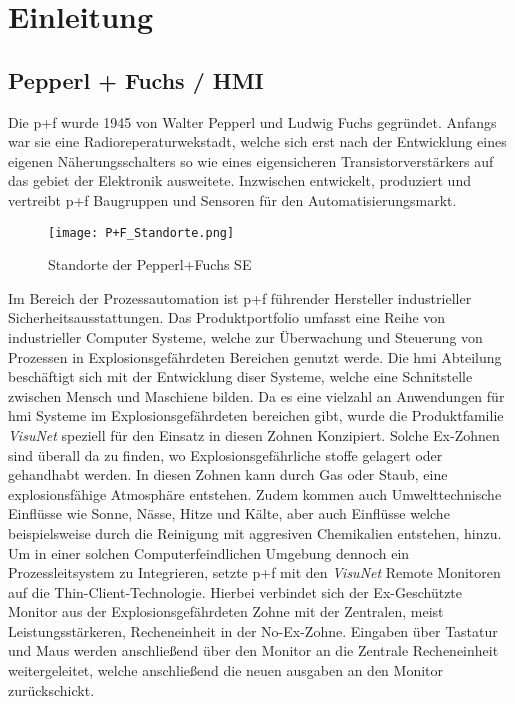 \chapter{Einleitung}
\section{Pepperl + Fuchs / HMI}\label{sec:PFHMI}
Die \ac{p+f} wurde 1945 von Walter Pepperl und Ludwig Fuchs gegründet. Anfangs war sie eine Radioreperaturwekstadt, welche sich erst nach der Entwicklung eines eigenen Näherungsschalters so wie eines eigensicheren Transistorverstärkers auf das gebiet der Elektronik ausweitete. Inzwischen entwickelt, produziert und vertreibt \ac{p+f} Baugruppen und Sensoren für den Automatisierungsmarkt.\\
\begin{flushleft}
    \begin{figure}[h!]
        \centering
        \texttt{[image: P+F\_Standorte.png]}
        \caption{Standorte der Pepperl+Fuchs SE}
        \label{fig:StandortePF}
    \end{figure}
\end{flushleft}
Im Bereich der Prozessautomation ist \ac*{p+f} führender Hersteller industrieller Sicherheitsausstattungen. Das Produktportfolio umfasst eine Reihe von industrieller Computer Systeme, welche zur Überwachung und Steuerung von Prozessen in Explosionsgefährdeten Bereichen genutzt werde. Die \ac{hmi} Abteilung beschäftigt sich mit der Entwicklung diser Systeme, welche eine Schnitstelle zwischen Mensch und Maschiene bilden. Da es eine vielzahl an Anwendungen für \ac{hmi} Systeme im Explosionsgefährdeten bereichen gibt, wurde die Produktfamilie \textit{VisuNet} speziell für den Einsatz in diesen Zohnen Konzipiert. Solche Ex-Zohnen sind überall da zu finden, wo Explosionsgefährliche stoffe gelagert oder gehandhabt werden. In diesen Zohnen kann durch Gas oder Staub, eine explosionsfähige Atmosphäre entstehen. Zudem kommen auch Umwelttechnische Einflüsse wie Sonne, Nässe, Hitze und Kälte, aber auch Einflüsse welche beispielsweise durch die Reinigung mit aggresiven Chemikalien entstehen, hinzu. Um in einer solchen Computerfeindlichen Umgebung dennoch ein Prozessleitsystem zu Integrieren, setzte \ac{p+f} mit den \textit{VisuNet} Remote Monitoren auf die Thin-Client-Technologie. Hierbei verbindet sich der Ex-Geschützte Monitor aus der Explosionsgefährdeten Zohne mit der Zentralen, meist Leistungsstärkeren, Recheneinheit in der No-Ex-Zohne. Eingaben über Tastatur und Maus werden anschließend über den Monitor an die Zentrale Recheneinheit weitergeleitet, welche anschließend die neuen ausgaben an den Monitor zurückschickt.  

